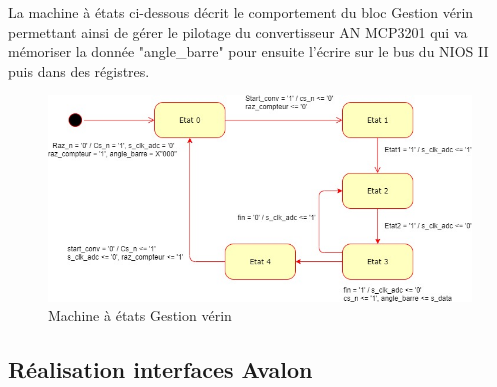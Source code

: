 La machine à états ci-dessous décrit le comportement du bloc Gestion vérin permettant ainsi de gérer le pilotage du convertisseur AN MCP3201 qui va mémoriser la donnée "angle\_barre" pour ensuite l'écrire sur le bus du NIOS II puis dans des régistres.
\vspace{1cm}
  \begin{figure}[h]
    \begin{center}
      \includegraphics[width=\textwidth]{images/MEF_verin.jpg}
      \caption{Machine à états Gestion vérin}
    \end{center}
  \end{figure}

  \newpage

  \subsection{Réalisation interfaces Avalon}

